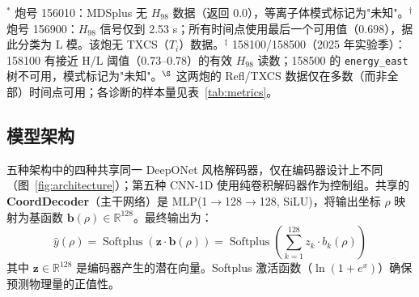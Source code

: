\documentclass[a4paper,12pt]{ctexart}
\begin{document}
\begin{table}[htbp]
\centering\footnotesize
\caption{测试集特征。7 炮（2024 与 2025 年 EAST 实验）均完全排除在训练集外。$T_e$ 范围为该炮各时间点 mtanh 拟合芯部 $T_e$ 的取值范围。}
\label{tab:testset}
\vspace{4pt}
\footnotesize{$^*$ 炮号 156010：MDSplus 无 $H_{98}$ 数据（返回 0.0），等离子体模式标记为"未知"。$^{\dagger}$ 炮号 156900：$H_{98}$ 信号仅到 2.53 s；所有时间点使用最后一个可用值（0.698），据此分类为 L 模。该炮无 TXCS（$T_i$）数据。$^{\ddagger}$ 158100/158500（2025 年实验季）：158100 有接近 H/L 阈值（0.73--0.78）的有效 $H_{98}$ 读数；158500 的 \texttt{energy\_east} 树不可用，模式标记为"未知"。$^{\S}$ 这两炮的 Refl/TXCS 数据仅在多数（而非全部）时间点可用；各诊断的样本量见表~\ref{tab:metrics}。}
\end{table}

\subsection{模型架构}

五种架构中的四种共享同一 DeepONet 风格解码器，仅在编码器设计上不同（图~\ref{fig:architecture}）；第五种 CNN-1D 使用纯卷积解码器作为控制组。共享的 \textbf{CoordDecoder}（主干网络）是 MLP(1$\to$128$\to$128, SiLU)，将输出坐标 $\rho$ 映射为基函数 $\mathbf{b}(\rho) \in \mathbb{R}^{128}$。最终输出为：
\begin{equation}
\hat{y}(\rho) = \operatorname{Softplus}\left(\mathbf{z} \cdot \mathbf{b}(\rho)\right) = \operatorname{Softplus}\left(\sum_{k=1}^{128} z_k \cdot b_k(\rho)\right)
\label{eq:dotproduct}
\end{equation}
其中 $\mathbf{z} \in \mathbb{R}^{128}$ 是编码器产生的潜在向量。Softplus 激活函数（$\ln(1 + e^x)$）确保预测物理量的正值性。
\end{document}
